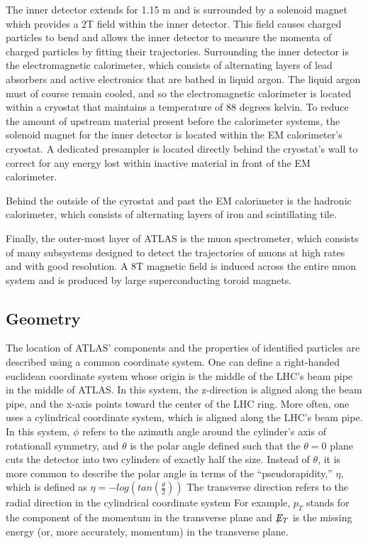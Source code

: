 The inner detector extends for 1.15 m and is surrounded by a solenoid magnet which provides a 2T field within the inner detector.
This field causes charged particles to bend and allows the inner detector to measure the momenta of charged particles by fitting their trajectories.
Surrounding the inner detector is the electromagnetic calorimeter, which consists of alternating layers of lead absorbers and active electronics that are bathed in liquid argon.
The liquid argon must of course remain cooled, and so the electromagnetic calorimeter is located within a cryostat that maintains a temperature of 88 degrees kelvin.
To reduce the amount of upstream material present before the calorimeter systems, the solenoid magnet for the inner detector is located within the EM calorimeter's cryostat.
A dedicated presampler is located directly behind the cryostat's wall to correct for any energy lost within inactive material in front of the EM calorimeter.

Behind the outside of the cyrostat and past the EM calorimeter is the hadronic calorimeter, which consists of alternating layers of iron and scintillating tile.

Finally, the outer-most layer of ATLAS is the muon spectrometer, which consists of many subsystems designed to detect the trajectories of muons at high rates and with good resolution. 
A 8T magnetic field is induced across the entire muon system and is produced by large superconducting toroid magnets.


\subsection{Geometry}
The location of ATLAS' components and the properties of identified particles are described using a common coordinate system.
One can define a right-handed euclidean coordinate system whose origin is the middle of the LHC's beam pipe in the middle of ATLAS.
In this system, the z-direction is aligned along the beam pipe, and the x-axis points toward the center of the LHC ring.
More often, one uses a cylindrical coordinate system, which is aligned along the LHC's beam pipe.
In this system, $\phi$ refers to the azimuth angle around the cylinder's axis of rotationall symmetry, and $\theta$ is the polar angle defined such that the $\theta=0$ plane cuts the detector into two cylinders of exactly half the size.
Instead of $\theta$, it is more common to describe the polar angle in terms of the ``pseudorapidity,'' $\eta$, which is defined as $\eta = -log(tan(\frac{\theta}{2}))$
The transverse direction refers to the radial direction in the cylindrical coordinate system 
For example, $p_{T}$ stands for the component of the momentum in the transverse plane and $\not\!\!{E_{T}}$ is the missing energy (or, more accurately, momentum) in the transverse plane.


